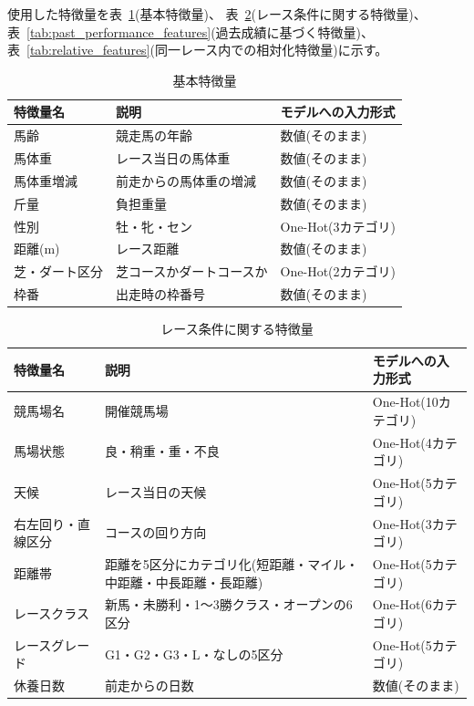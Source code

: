 \documentclass[dvipdfmx, a4paper, 11pt, titlepage]{jsarticle}
\begin{document}
使用した特徴量を表~\ref{tab:basic_features}(基本特徴量)、
表~\ref{tab:race_condition_features}(レース条件に関する特徴量)、
表~\ref{tab:past_performance_features}(過去成績に基づく特徴量)、
表~\ref{tab:relative_features}(同一レース内での相対化特徴量)に示す。
\begin{table}[H]
  \centering
  \caption{基本特徴量}
  \label{tab:basic_features}
  \begin{tabular}{p{3.2cm}p{5.5cm}p{3.5cm}}
    \toprule
    特徴量名 & 説明 & モデルへの入力形式 \\
    \midrule
    馬齢 & 競走馬の年齢 & 数値(そのまま) \\
    馬体重 & レース当日の馬体重 & 数値(そのまま) \\
    馬体重増減 & 前走からの馬体重の増減 & 数値(そのまま) \\
    斤量 & 負担重量 & 数値(そのまま) \\
    性別 & 牡・牝・セン & One-Hot(3カテゴリ) \\
    距離(m) & レース距離 & 数値(そのまま) \\
    芝・ダート区分 & 芝コースかダートコースか & One-Hot(2カテゴリ) \\
    枠番 & 出走時の枠番号 & 数値(そのまま) \\
    \bottomrule
  \end{tabular}
\end{table}

\begin{table}[H]
  \centering
  \caption{レース条件に関する特徴量}
  \label{tab:race_condition_features}
  \begin{tabular}{p{3.2cm}p{7.2cm}p{3.5cm}}
    \toprule
    特徴量名 & 説明 & モデルへの入力形式 \\
    \midrule
    競馬場名 & 開催競馬場 & One-Hot(10カテゴリ) \\
    馬場状態 & 良・稍重・重・不良 & One-Hot(4カテゴリ) \\
    天候 & レース当日の天候 & One-Hot(5カテゴリ) \\
    右左回り・直線区分 & コースの回り方向 & One-Hot(3カテゴリ) \\
    距離帯 & 距離を5区分にカテゴリ化(短距離・マイル・中距離・中長距離・長距離) & One-Hot(5カテゴリ) \\
    レースクラス & 新馬・未勝利・1〜3勝クラス・オープンの6区分 & One-Hot(6カテゴリ) \\
    レースグレード & G1・G2・G3・L・なしの5区分 & One-Hot(5カテゴリ) \\
    休養日数 & 前走からの日数 & 数値(そのまま) \\
    \bottomrule
  \end{tabular}
\end{table}
\end{document}
